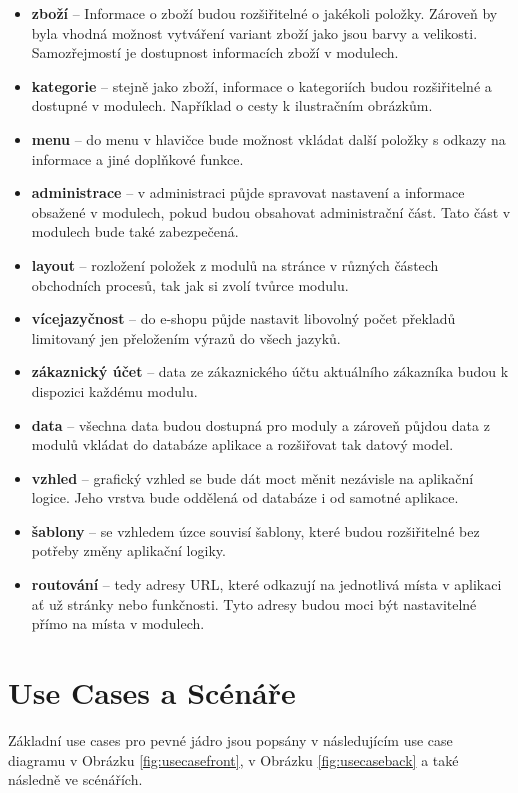 \documentclass[11pt,twoside,a4paper]{book}
\begin{document}
\begin{itemize}
\item \textbf{zboží} -- Informace o zboží budou rozšiřitelné o jakékoli položky. Zároveň by byla vhodná možnost vytváření variant zboží jako jsou barvy a velikosti. Samozřejmostí je dostupnost informacích zboží v modulech.
\item \textbf{kategorie} -- stejně jako zboží, informace o kategoriích budou rozšiřitelné a dostupné v modulech. Například o cesty k ilustračním obrázkům.
\item \textbf{menu} -- do menu v hlavičce bude možnost vkládat další položky s odkazy na informace a jiné doplňkové funkce.
\item \textbf{administrace} -- v administraci půjde spravovat nastavení a informace obsažené v modulech, pokud budou obsahovat administrační část. Tato část v modulech bude také zabezpečená.
\item \textbf{layout} -- rozložení položek z modulů na stránce v různých částech obchodních procesů, tak jak si zvolí tvůrce modulu.
\item \textbf{vícejazyčnost} -- do e-shopu půjde nastavit libovolný počet překladů limitovaný jen přeložením výrazů do všech jazyků.
\item \textbf{zákaznický účet} -- data ze zákaznického účtu aktuálního zákazníka budou k dispozici každému modulu.
\item \textbf{data} -- všechna data budou dostupná pro moduly a zároveň půjdou data z modulů vkládat do databáze aplikace a rozšiřovat tak datový model.
\item \textbf{vzhled} -- grafický vzhled se bude dát moct měnit nezávisle na aplikační logice. Jeho vrstva bude oddělená od databáze i od samotné aplikace.
\item \textbf{šablony} -- se vzhledem úzce souvisí šablony, které budou rozšiřitelné bez potřeby změny aplikační logiky.
\item \textbf{routování} -- tedy adresy URL, které odkazují na jednotlivá místa v aplikaci ať už stránky nebo funkčnosti. Tyto adresy budou moci být nastavitelné přímo na místa v modulech. 
\end{itemize}


\section{Use Cases a Scénáře}
\label{sec:usecase}
Základní use cases pro pevné jádro jsou popsány v následujícím use case diagramu v Obrázku \ref{fig:usecasefront}, v Obrázku \ref{fig:usecaseback} a také následně ve scénářích.
\end{document}
